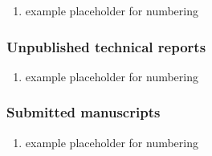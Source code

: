 \begin{enumerate}
  \setcounter{enumi}{\value{paperCount}}
  \item example placeholder for numbering
  \setcounter{paperCount}{\value{enumi}}
\end{enumerate}

\subsubsection*{Unpublished technical reports}

\begin{enumerate}
  \setcounter{enumi}{\value{paperCount}}
  \item example placeholder for numbering 
  \setcounter{paperCount}{\value{enumi}}
\end{enumerate}
  
\subsubsection*{Submitted manuscripts}

\begin{enumerate}
  \setcounter{enumi}{\value{paperCount}}
  \item example placeholder for numbering 
  \setcounter{paperCount}{\value{enumi}}
\end{enumerate}